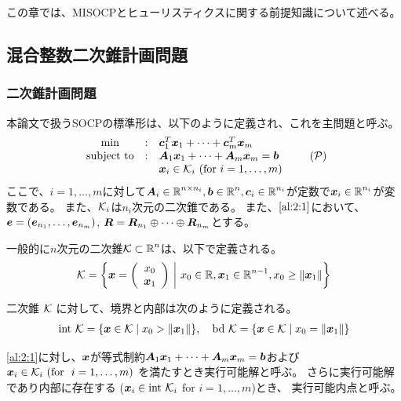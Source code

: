 \documentclass[11pt,a4paper,dvipdfmx,titlepage,uplatex]{jsarticle}
\theoremstyle{mystyle}
\newcommand{\0}{\mathbf{0}}
\def\b{\mbox{\boldmath $b$}}
\def\c{\mbox{\boldmath $c$}}
\def\e{\mbox{\boldmath $e$}}
\def\x{\mbox{\boldmath $x$}}
\def\A{\mbox{\boldmath $A$}}
\def\R{\mbox{\boldmath $R$}}
\def\KC{\mbox{$\cal K$}}
\def\PC{\mbox{$\cal P$}}
\def\Real{\mbox{$\mathbb{R}$}}
\begin{document}
この章では、MISOCPとヒューリスティクスに関する前提知識について述べる。

\subsection{混合整数二次錐計画問題}\label{sec:Second_Order_Cone_Programming}

\subsubsection{二次錐計画問題}\label{sec:Second_Order_Cone_Programming:standard_formulation}
本論文で扱うSOCPの標準形は、以下のように定義され、これを主問題と呼ぶ。
\begin{align}
  \begin{array}{cclc}
		\min & : & \c_1^T \x_1 + \dots + \c_m^T \x_m \\
		\text{subject to} & : & \A_1 \x_1 + \dots + \A_m \x_m = \b \\
		& & \x_i \in \KC_i \ (\text{for} \ i = 1, \dots , m)
  \end{array}
  \tag{$\PC$}
  \label{al:2:1}
\end{align}
ここで、$i = 1, \dots , m$に対して$ \A_i \in \Real^{n \times n_i} , \b \in \Real^n , \c_i \in \Real^{n_i}$が定数で$\x_i \in \Real^{n_i}$が変数である。
また、$\KC_i$は$n_i$次元の二次錐である。
また、$\eqref{al:2:1}$において、$\e = (\e_{n_1}, \dots, \e_{n_m})$, $\R = \R_{n_1} \oplus \cdots \oplus \R_{n_m}$とする。

一般的に$n$次元の二次錐$\KC \subset \Real^n$は、以下で定義される。
\begin{align}
	\KC = \left\{ \x = \left(
	\begin{array}{c}
		x_0 \\
		\x_1
	\end{array}
	\right) \
	\middle| \ x_0 \in \Real, \x_1 \in \Real^{n-1},  x_0 \ge \|\x_1\| \right\}
\end{align}

二次錐 $\KC$ に対して、境界と内部は次のように定義される。
\begin{align}
	\text{int} \ \KC = \{ \x \in \KC \mid x_0 > \|\x_1\| \}, \quad
	\text{bd} \ \KC = \{ \x \in \KC \mid x_0 = \|\x_1\| \}
\end{align}

\eqref{al:2:1}に対し、$\x$が等式制約$\A_1 \x_1 + \dots + \A_m \x_m = \b$および
$\x_i \in \KC_i \ (\text{for} \ \ i = 1, \dots , m)$
を満たすとき実行可能解と呼ぶ。
さらに実行可能解であり内部に存在する ($\x_i \in \text{int} \ \KC_i$ for $i=1,\dots,m$)とき、
実行可能内点と呼ぶ。
\end{document}
